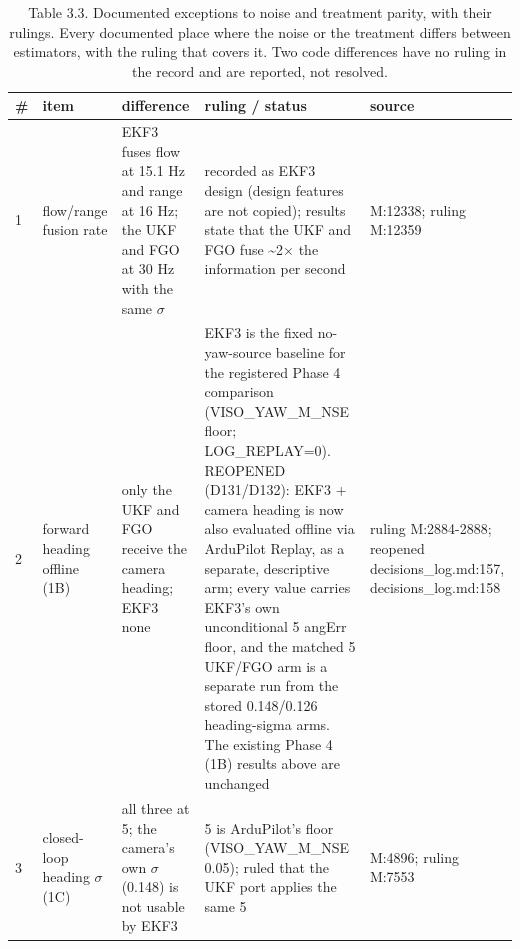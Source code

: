 \begin{table}[htbp]
\centering
\scriptsize
\caption{Table 3.3. Documented exceptions to noise and treatment parity, with their rulings. Every documented place where the noise or the treatment differs between estimators, with the ruling that covers it. Two code differences have no ruling in the record and are reported, not resolved.}
\label{tab:3-3}
\begin{tabular}{p{}p{}p{}p{}p{}}
\toprule
\textbf{\#} & \textbf{item} & \textbf{difference} & \textbf{ruling / status} & \textbf{source} \\
\midrule
1 & flow/range fusion rate & EKF3 fuses flow at 15.1 Hz and range at 16 Hz; the UKF and FGO at 30 Hz with the same $\sigma$ & recorded as EKF3 design (design features are not copied); results state that the UKF and FGO fuse \textasciitilde{}2$\times$ the information per second & M:12338; ruling M:12359 \\
2 & forward heading offline (1B) & only the UKF and FGO receive the camera heading; EKF3 none & EKF3 is the fixed no-yaw-source baseline for the registered Phase 4 comparison (VISO\_YAW\_M\_NSE floor; LOG\_REPLAY=0). REOPENED (D131/D132): EKF3 + camera heading is now also evaluated offline via ArduPilot Replay, as a separate, descriptive arm; every value carries EKF3's own unconditional 5\textdegree{} angErr floor, and the matched 5\textdegree{} UKF/FGO arm is a separate run from the stored 0.148\textdegree{}/0.126\textdegree{} heading-sigma arms. The existing Phase 4 (1B) results above are unchanged & ruling M:2884-2888; reopened decisions\_log.md:157, decisions\_log.md:158 \\
3 & closed-loop heading $\sigma$ (1C) & all three at 5\textdegree{}; the camera's own $\sigma$ (0.148\textdegree{}) is not usable by EKF3 & 5\textdegree{} is ArduPilot's floor (VISO\_YAW\_M\_NSE 0.05); ruled that the UKF port applies the same 5\textdegree{} & M:4896; ruling M:7553 \\

\end{tabular}
\end{table}
